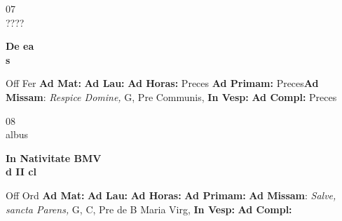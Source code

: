 \documentclass[10pt, openany]{book}
\begin{document}
    \begin{center}
        \begin{minipage}{3.5in}
            \vspace{2em}
            \begin{minipage}{0.5in}
                {\Huge 07} \\
                {\normalsize ????}
            \end{minipage}
            \begin{minipage}{3.0in}
                \textbf{ \large De ea \\
                \textnormal{\normalsize s}}

            \end{minipage}
            \begin{justify}Off Fer
                \textbf{Ad Mat: }
                \textbf{Ad Lau: }
                \textbf{Ad Horas: }Preces
                \textbf{Ad Primam: }Preces\textbf{Ad Missam}: \textit{Respice Domine,} G, Pre Communis, 
                \textbf{In Vesp: }
                \textbf{Ad Compl: }Preces
            \end{justify}
        \end{minipage}
    \end{center}

    \begin{center}
        \begin{minipage}{3.5in}
            \vspace{2em}
            \begin{minipage}{0.5in}
                {\Huge 08} \\
                {\normalsize albus}
            \end{minipage}
            \begin{minipage}{3.0in}
                \textbf{ \large In Nativitate BMV \\
                \textnormal{\normalsize d II cl}}

            \end{minipage}
            \begin{justify}Off Ord
                \textbf{Ad Mat: }
                \textbf{Ad Lau: }
                \textbf{Ad Horas: }
                \textbf{Ad Primam: }\textbf{Ad Missam}: \textit{Salve, sancta Parens,} G, C, Pre de B Maria Virg, 
                \textbf{In Vesp: }
                \textbf{Ad Compl: }
            \end{justify}
        \end{minipage}
    \end{center}
\end{document}
